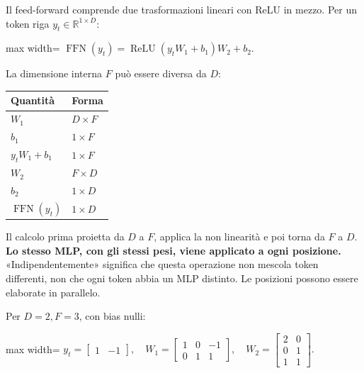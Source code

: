 \documentclass[11pt,a4paper,oneside,openany]{book}
\begin{document}
Il feed-forward comprende due trasformazioni lineari con ReLU in mezzo. Per un token riga \(y_t\in\mathbb R^{1\times D}\):

\begin{center}
\begin{adjustbox}{max width=\linewidth}
$\displaystyle \boxed{\operatorname{FFN}(y_t)=\operatorname{ReLU}(y_tW_1+b_1)W_2+b_2.}$
\end{adjustbox}
\end{center}

La dimensione interna \(F\) può essere diversa da \(D\):

\begin{longtable}[]{@{}ll@{}}
\toprule\noalign{}
Quantità & Forma \\
\midrule\noalign{}
\endhead
\bottomrule\noalign{}
\endlastfoot
\(W_1\) & \(D\times F\) \\
\(b_1\) & \(1\times F\) \\
\(y_tW_1+b_1\) & \(1\times F\) \\
\(W_2\) & \(F\times D\) \\
\(b_2\) & \(1\times D\) \\
\(\operatorname{FFN}(y_t)\) & \(1\times D\) \\
\end{longtable}

Il calcolo prima proietta da \(D\) a \(F\), applica la non linearità e poi torna da \(F\) a \(D\). \textbf{Lo stesso MLP, con gli stessi pesi, viene applicato a ogni posizione.} «Indipendentemente» significa che questa operazione non mescola token differenti, non che ogni token abbia un MLP distinto. Le posizioni possono essere elaborate in parallelo.

Per \(D=2,F=3\), con bias nulli:

\begin{center}
\begin{adjustbox}{max width=\linewidth}
$\displaystyle y_t=\begin{bmatrix}1&-1\end{bmatrix},\quad
W_1=\begin{bmatrix}1&0&-1\\0&1&1\end{bmatrix},\quad
W_2=\begin{bmatrix}2&0\\0&1\\1&1\end{bmatrix}.$
\end{adjustbox}
\end{center}
\end{document}

